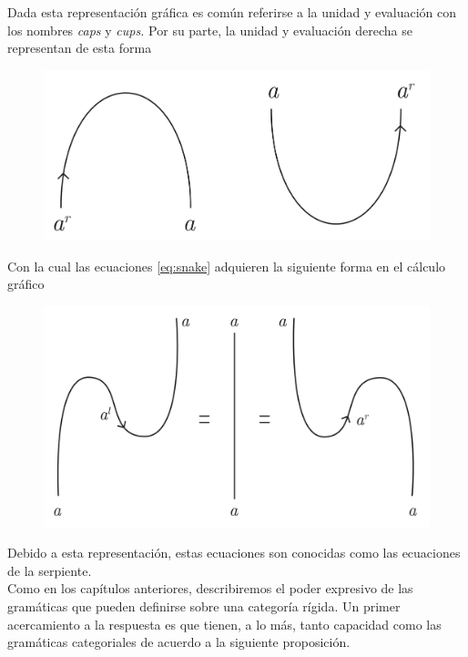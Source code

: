 \documentclass[../main.tex]{subfiles}
\begin{document}
    \noindent Dada esta representación gráfica es común referirse a la unidad y evaluación con los nombres \textit{caps} y \textit{cups.} Por su parte, la unidad y evaluación derecha se representan de esta forma
    \begin{center}
        \begin{figure}[H]
		\includegraphics[scale=.2]{TeX/diagrama/5-3.pdf}
		\centering
	   \end{figure}
        \end{center}
    Con la cual las ecuaciones \eqref{eq:snake} adquieren la siguiente forma en el cálculo gráfico
    \begin{center}
        \begin{figure}[H]
		\includegraphics[scale=.2]{TeX/diagrama/5-4.pdf}
		\centering
	   \end{figure}
        \end{center}
    Debido a esta representación, estas ecuaciones son conocidas como las ecuaciones de la serpiente. \\

    Como en los capítulos anteriores, describiremos el poder expresivo de las gramáticas que pueden definirse sobre una categoría rígida. Un primer acercamiento a la respuesta es que tienen, a lo más, tanto capacidad como las gramáticas categoriales de acuerdo a la siguiente proposición.  
\end{document}
